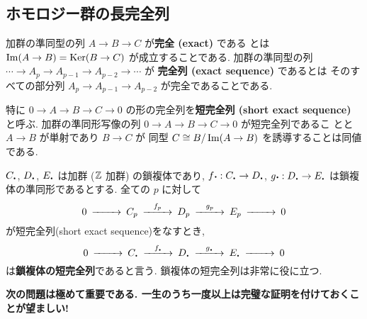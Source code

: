 \documentclass[12pt,twoside]{jarticle}
\begin{document}

\subsection{ホモロジー群の長完全列}

加群の準同型の列 $A\to B\to C$ が{\bf 完全 (exact)} である
とは $\mathop{\mathrm{Im}}\nolimits(A\to B) = \mathop{\mathrm{Ker}}\nolimits(B\to C)$ が成立することである.
加群の準同型の列 $\cdots \to A_p \to A_{p-1} \to A_{p-2} \to \cdots$ が
{\bf 完全列 (exact sequence)} であるとは
そのすべての部分列 $A_p\to A_{p-1}\to A_{p-2}$ が完全であることである.

特に $0 \to A \to B \to C \to 0$ の形の完全列を{\bf 短完全列 
(short exact sequence)} と呼ぶ.
加群の準同形写像の列 $0 \to A \to B \to C \to 0$ が短完全列であるこ
とと $A \to B$ が単射であり $B \to C$ が
同型 $C \cong B/\mathop{\mathrm{Im}}\nolimits(A\to B)$ を誘導することは同値である.

$C_\bcdot$, $D_\bcdot$, $E_\bcdot$ は加群 (${\mathbb Z}$ 加群) の鎖複体であり,
$f\bcdot : C_\bcdot \to D_\bcdot$, $g\bcdot : D_\bcdot \to E_\bcdot$ 
は鎖複体の準同形であるとする. 全ての $p$ に対して
\[
\begin{CD}
  0 @>>> C_p @>f_p>> D_p @>g_p>> E_p @>>> 0
\end{CD}
\]
が短完全列(short exact sequence)をなすとき,
\[
\begin{CD}
  0 @>>>
  C_\bcdot @>f_{\raise0.05ex\hbox{\bf.}}>>
  D_\bcdot @>g_{\raise0.05ex\hbox{\bf.}}>> E_\bcdot @>>> 0
\end{CD}
\]
は{\bf 鎖複体の短完全列}であると言う.  
鎖複体の短完全列は非常に役に立つ.

\medskip
{\large\bf 次の問題は極めて重要である. 
一生のうち一度以上は完璧な証明を付けておくことが望ましい!}
\end{document}
